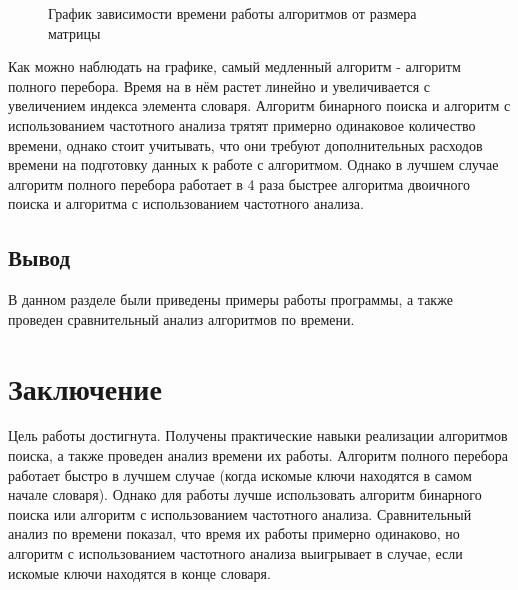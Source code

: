 \documentclass[12pt]{report}
\begin{document}
\begin{figure}[ht!]
	\caption{График зависимости времени работы алгоритмов от размера матрицы}
\end{figure}

Как можно наблюдать на графике, самый медленный алгоритм - алгоритм полного перебора. Время на в нём растет линейно и увеличивается с увеличением индекса элемента словаря. Алгоритм бинарного
поиска и алгоритм с использованием частотного анализа трятят примерно одинаковое количество времени, однако стоит учитывать, что они требуют дополнительных расходов времени на подготовку данных к работе с алгоритмом.
Однако в лучшем случае алгоритм полного перебора работает в 4 раза быстрее алгоритма двоичного поиска и алгоритма с использованием частотного анализа.

\newpage
\section{Вывод}
В данном разделе были приведены примеры работы программы, а также проведен сравнительный анализ алгоритмов по времени.

\newpage
\chapter*{Заключение}
Цель работы достигнута. Получены практические навыки реализации алгоритмов поиска, а также проведен анализ времени их работы. Алгоритм полного перебора работает быстро в лучшем случае (когда искомые ключи находятся в самом начале словаря). Однако для работы лучше использовать алгоритм бинарного поиска или алгоритм с использованием частотного анализа. Сравнительный анализ по времени показал, что время их работы примерно одинаково, но алгоритм с использованием частотного анализа выигрывает в случае, если искомые ключи находятся в конце словаря.
\end{document}
